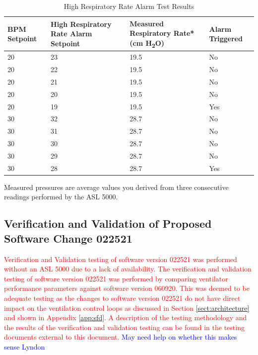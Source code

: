 \documentclass[]{article}
\begin{document}
\begin{center}
	\begin{table}[h]
		\caption{High Respiratory Rate Alarm Test Results}
		\label{tab:high_rr_test}
		\begin{tabular}{ |p{3.7cm}|p{3.3cm}|p{4cm}| p{2.9cm}|}
			
			\hline
			\textbf{BPM Setpoint} & \textbf{High Respiratory Rate Alarm Setpoint} & \textbf{Measured Respiratory Rate* (cm H\textsubscript{2}O)} & \textbf{Alarm Triggered}  \\ \hline
			20 & 23 & 19.5 & No\\ \hline
			20 & 22 & 19.5& No\\ \hline
			20 & 21& 19.5& No\\ \hline
			20 & 20 & 19.5 & No\\ \hline
			20 & 19 & 19.5 & Yes\\ \hline
			30 & 32 & 28.7 & No\\ \hline
			30 & 31 & 28.7 & No\\ \hline
			30 & 30 & 28.7 & No\\ \hline
			30 & 29 & 28.7 & No\\ \hline
			30 & 28 & 28.7 & Yes\\ \hline
		\end{tabular}
		\noindent *Measured pressures are average values you derived from three consecutive readings performed by the ASL 5000.
	\end{table}	
\end{center}

\subsection{Verification and Validation of Proposed Software Change 022521}
\label{Sec:VandV022521}
\textcolor{red}{Verification and Validation testing of software version 022521 was performed without an ASL 5000 due to a lack of availability. The verification and validation testing of software version 022521 was performed by comparing ventilator performance parameters against software version 060920. This was deemed to be adequate testing as the changes to software version 022521 do not have direct impact on the ventilation control loops as discussed in Section \ref{sect:architecture} and shown in Appendix \ref{app:sfd}. A description of the testing methodology and the results of the verification and validation testing can be found in the testing documents external to this document.} \textcolor{blue}{May need help on whether this makes sense Lyndon}
\end{document}
